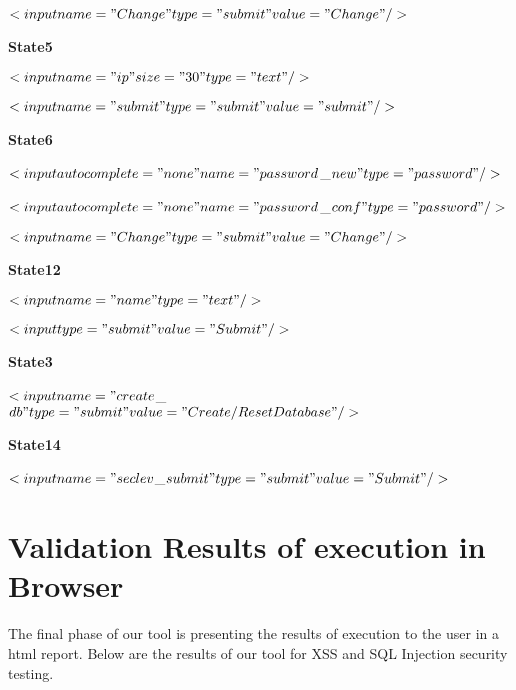  $<input name="Change" type="submit" value="Change"/>$


\newline
\textbf{State5}

$<input name="ip" size="30" type="text"/>$

$<input name="submit" type="submit" value="submit"/>$

\newline
\textbf{State6}

$<input autocomplete="none" name="password$\_$new" type="password"/>$

$<input autocomplete="none" name="password$\_$conf" type="password"/>$

$<input name="Change" type="submit" value="Change"/>$
 
\newline
\textbf{State12}

$<input name="name" type="text"/>$

$<input type="submit" value="Submit"/>$

\newline
\textbf{State3}

$<input name="create$\_$db" type="submit" value="Create / Reset Database"/>$

\newline
\textbf{State14}

$<input name="seclev$\_$submit" type="submit" value="Submit"/>$

\section{Validation Results of execution in Browser}

The final phase of our tool is presenting the results of execution to the user in a html report. Below are the results of our tool for XSS and SQL Injection security testing.

